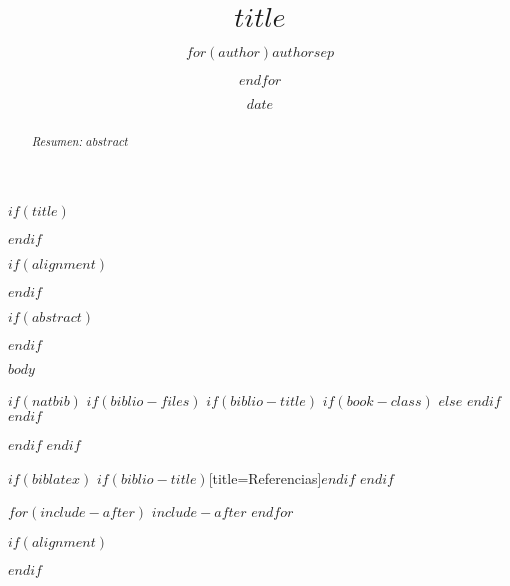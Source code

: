 \documentclass[letterpaper, 12pt, spanish]{article}
\title{$title$}
\author{$for(author)$$author$$sep$ \and $endfor$}
\date{$date$}
\begin{document}
  $if(title)$
  \maketitle
  $endif$

  $if(alignment)$
  \begin{$alignment$}
  $endif$

  $if(abstract)$
  \begin{abstract}
  \noindent \emph{Resumen:} $abstract$
  \end{abstract}
  $endif$

  $body$

  $if(natbib)$
  $if(biblio-files)$
  $if(biblio-title)$
  $if(book-class)$
  \renewcommand\bibname{Bibliography}
  $else$
  \renewcommand\refname{References}
  $endif$
  $endif$
  
  $endif$
  $endif$

  $if(biblatex)$
  \printbibliography$if(biblio-title)$[title=Referencias]$endif$
  $endif$

  $for(include-after)$
  $include-after$
  $endfor$

  $if(alignment)$
  \end{$alignment$}
  $endif$
\end{document}
